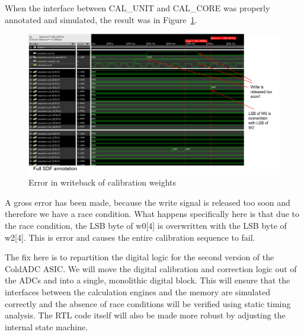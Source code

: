 When the interface between CAL\_UNIT and CAL\_CORE was properly annotated and simulated, the result was in Figure~\ref{fig:errorcalwrite}.
\begin{figure}[htb]
\centering
\begin{center}
\includegraphics[width=1.0\textwidth]{figures/ErrorCalWrite.png}
\end{center}
\caption{Error in writeback of calibration weights}
\label{fig:errorcalwrite}
\end{figure}
A gross error has been made, because the write signal is released too soon and therefore we have a race condition. What happens specifically here is that due to the race condition, the LSB byte of w0[4] is overwritten with the LSB byte of w2[4]. This is error and causes the entire calibration sequence to fail.

The fix here is to repartition the digital logic for the second version of the ColdADC ASIC. We will move the digital calibration and correction logic out of the ADCs and into a single, monolithic digital block. This will ensure that the interfaces between the calculation engines and the memory are simulated correctly and the absence of race conditions will be verified using static timing analysis. The RTL code itself will also be made more robust by adjusting the internal state machine.

